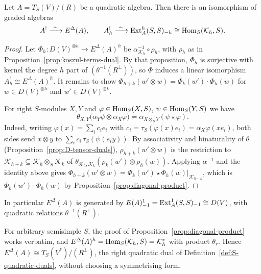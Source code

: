 \begin{theorem}\label{thm:yoneda-quadratic-dual}
Let $A=T_S(V)/(R)$ be a quadratic algebra.
Then there is an isomorphism of graded algebras
\[
A^!\xrightarrow{\ \sim\ }E^\Delta(A),\qquad A^!_h\xrightarrow{\ \sim\ }\operatorname{Ext}\nolimits_A^h(S,S)_{-h}\cong\operatorname{Hom}\nolimits_S(\mathcal K_h,S).
\]
\end{theorem}

\begin{proof}
Let $\Phi_h:D(V)^{\otimes h}\to E^\Delta(A)^h$ be $\alpha_{\mathcal K_h}^{-1}\circ\rho_h$, with $\rho_h$ as in Proposition~\ref{prop:koszul-terms-dual}.
By that proposition, $\Phi_h$ is surjective with kernel the degree $h$ part of $(\theta^{-1}(R^\perp))$, so $\Phi$ induces a linear isomorphism $A^!_h\cong E^\Delta(A)^h$.
It remains to show $\Phi_{h+k}(w'\otimes w)=\Phi_k(w')\cdot\Phi_h(w)$ for $w\in D(V)^{\otimes h}$ and $w'\in D(V)^{\otimes k}$.

For right $S$-modules $X,Y$ and $\varphi\in\operatorname{Hom}\nolimits_S(X,S)$, $\psi\in\operatorname{Hom}\nolimits_S(Y,S)$ we have
\[
\theta_{X,Y}\bigl(\alpha_Y\psi\otimes\alpha_X\varphi\bigr)=\alpha_{X\otimes_SY}(\psi\star\varphi).
\]
Indeed, writing $\varphi(x)=\sum_ic_ie_i$ with $c_i=\tau_S(\varphi(x)e_i)=\alpha_X\varphi(xe_i)$, both sides send $x\otimes y$ to $\sum_ic_i\,\tau_S(\psi(e_iy))$.
By associativity and binaturality of $\theta$ (Proposition~\ref{prop:D-tensor-duals}), $\rho_{h+k}(w'\otimes w)$ is the restriction to $\mathcal K_{h+k}\subseteq\mathcal K_h\otimes_S\mathcal K_k$ of $\theta_{\mathcal K_h,\mathcal K_k}(\rho_k(w')\otimes\rho_h(w))$.
Applying $\alpha^{-1}$ and the identity above gives $\Phi_{h+k}(w'\otimes w)=\Phi_k(w')\star\Phi_h(w)|_{\mathcal K_{h+k}}$, which is $\Phi_k(w')\cdot\Phi_h(w)$ by Proposition~\ref{prop:diagonal-product}.
\end{proof}

In particular $E^\Delta(A)$ is generated by $E(A)^1_{-1}=\operatorname{Ext}\nolimits^1_A(S,S)_{-1}\cong D(V)$, with quadratic relations $\theta^{-1}(R^\perp)$.

\begin{advanced}
\begin{remark}[General $S$]
For arbitrary semisimple $S$, the proof of Proposition~\ref{prop:diagonal-product} works verbatim, and $E^\Delta(A)^h=\operatorname{Hom}\nolimits_S(\mathcal K_h,S)=\mathcal K_h^*$ with product $\theta_r$.
Hence $E^\Delta(A)\cong T_S(V^*)/(R^\perp)$, the right quadratic dual of Definition~\ref{def:S-quadratic-duals}, without choosing a symmetrising form.
\end{remark}
\end{advanced}

